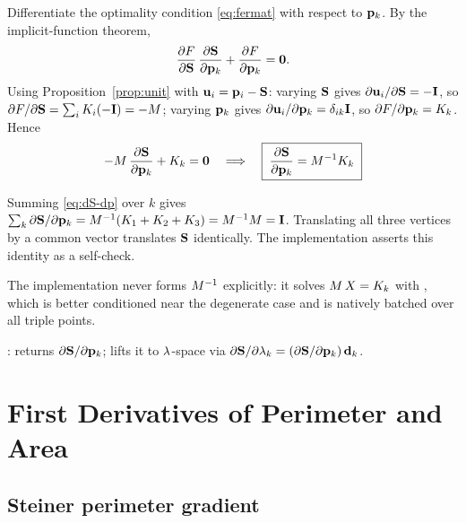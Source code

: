 \documentclass[11pt,a4paper]{article}
\begin{document}
Differentiate the optimality condition \eqref{eq:fermat} with respect to
$\mathbf{p}_{k}$.  By the implicit-function theorem,
\begin{equation}
  \dfrac{\partial F}{\partial \mathbf{S}}\,\dfrac{\partial \mathbf{S}}{\partial \mathbf{p}_{k}} + \dfrac{\partial F}{\partial \mathbf{p}_{k}} = \mathbf{0}.
\end{equation}
Using Proposition~\ref{prop:unit} with $\mathbf{u}_i = \mathbf{p}_{i}-\mathbf{S}$:
varying $\mathbf{S}$ gives $\partial\mathbf{u}_i/\partial\mathbf{S} = -\mathbf{I}$, so
$\partial F/\partial\mathbf{S} = \sum_i K_i(-\mathbf{I}) = -M$; varying $\mathbf{p}_{k}$
gives $\partial\mathbf{u}_i/\partial\mathbf{p}_{k} = \delta_{ik}\mathbf{I}$, so
$\partial F/\partial\mathbf{p}_{k} = K_k$.  Hence
\begin{equation}
  -M\,\dfrac{\partial \mathbf{S}}{\partial \mathbf{p}_{k}} + K_k = \mathbf{0}
  \quad\Longrightarrow\quad
  \boxed{\;\dfrac{\partial \mathbf{S}}{\partial \mathbf{p}_{k}} = M^{-1}K_k\;}
  \label{eq:dS-dp}
\end{equation}

\begin{remark}
\label{rem:translation}
Summing \eqref{eq:dS-dp} over $k$ gives
$\sum_k\partial\mathbf{S}/\partial\mathbf{p}_{k} = M^{-1}(K_1+K_2+K_3) = M^{-1}M
= \mathbf{I}$.  Translating all three vertices by a common vector translates
$\mathbf{S}$ identically.  The implementation asserts this identity as a self-check.
\end{remark}

The implementation never forms $M^{-1}$ explicitly: it solves
$M\,X = K_k$ with , which is better conditioned near
the degenerate case and is natively batched over all triple points.

\begin{tcolorbox}[colback=blue!4!white, colframe=blue!40!black,
                  title={Code: first derivative of S}, fontupper=\small]
:
 returns $\partial\mathbf{S}/\partial\mathbf{p}_{k}$;
 lifts it to $\lambda$-space via
$\partial\mathbf{S}/\partial\lambda_k = (\partial\mathbf{S}/\partial\mathbf{p}_{k})\,\mathbf{d}_{k}$.
\end{tcolorbox}

\section{First Derivatives of Perimeter and Area}
\label{sec:first}

\subsection{Steiner perimeter gradient}
\end{document}
